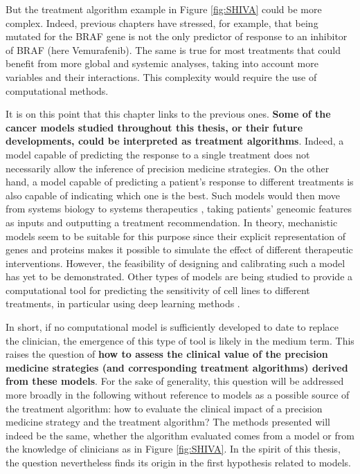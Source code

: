 \documentclass[a4paper,12pt,twoside,onecolumn,openright,final,oldfontcommands]{memoir}
\begin{document}
But the treatment algorithm example in Figure \ref{fig:SHIVA} could be
more complex. Indeed, previous chapters have stressed, for example, that
being mutated for the BRAF gene is not the only predictor of response to
an inhibitor of BRAF (here Vemurafenib). The same is true for most
treatments that could benefit from more global and systemic analyses,
taking into account more variables and their interactions. This
complexity would require the use of computational methods.

It is on this point that this chapter links to the previous ones.
\textbf{Some of the cancer models studied throughout this thesis, or
their future developments, could be interpreted as treatment
algorithms}. Indeed, a model capable of predicting the response to a
single treatment does not necessarily allow the inference of precision
medicine strategies. On the other hand, a model capable of predicting a
patient's response to different treatments is also capable of indicating
which one is the best. Such models would then move from systems biology
to systems therapeutics \citep{hansen2013computation}, taking patients'
geneomic features as inputs and outputting a treatment recommendation.
In theory, mechanistic models seem to be suitable for this purpose since
their explicit representation of genes and proteins makes it possible to
simulate the effect of different therapeutic interventions. However, the
feasibility of designing and calibrating such a model has yet to be
demonstrated. Other types of models are being studied to provide a
computational tool for predicting the sensitivity of cell lines to
different treatments, in particular using deep learning methods
\citep{manica2019toward}.

In short, if no computational model is sufficiently developed to date to
replace the clinician, the emergence of this type of tool is likely in
the medium term. This raises the question of \textbf{how to assess the
clinical value of the precision medicine strategies (and corresponding
treatment algorithms) derived from these models}. For the sake of
generality, this question will be addressed more broadly in the
following without reference to models as a possible source of the
treatment algorithm: how to evaluate the clinical impact of a precision
medicine strategy and the treatment algorithm? The methods presented
will indeed be the same, whether the algorithm evaluated comes from a
model or from the knowledge of clinicians as in Figure \ref{fig:SHIVA}.
In the spirit of this thesis, the question nevertheless finds its origin
in the first hypothesis related to models.
\end{document}
